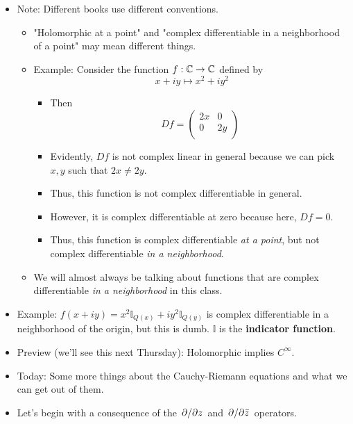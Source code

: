 \documentclass[../notes.tex]{subfiles}
\begin{document}
\begin{itemize}
\begin{itemize}
    \end{itemize}
    \item Note: Different books use different conventions.
    \begin{itemize}
        \item "Holomorphic at a point" and "complex differentiable in a neighborhood of a point" may mean different things.
        \item Example: Consider the function $f:\mathbb{C}\to\mathbb{C}$ defined by
        \begin{equation*}
            x+iy \mapsto x^2+iy^2
        \end{equation*}
        \begin{itemize}
            \item Then
            \begin{equation*}
                Df =
                \begin{pmatrix}
                    2x & 0\\
                    0 & 2y\\
                \end{pmatrix}
            \end{equation*}
            \item Evidently, $Df$ is not complex linear in general because we can pick $x,y$ such that $2x\neq 2y$.
            \item Thus, this function is not complex differentiable in general.
            \item However, it is complex differentiable at zero because here, $Df=0$.
            \item Thus, this function is complex differentiable \emph{at a point}, but not complex differentiable \emph{in a neighborhood}.
        \end{itemize}
        \item We will almost always be talking about functions that are complex differentiable \emph{in a neighborhood} in this class.
    \end{itemize}
    \item Example: $f(x+iy)=x^2\mathbb{I}_{Q(x)}+iy^2\mathbb{I}_{Q(y)}$ is complex differentiable in a neighborhood of the origin, but this is dumb. $\mathbb{I}$ is the \textbf{indicator function}.
    \item Preview (we'll see this next Thursday): Holomorphic implies $C^\infty$.
    \item Today: Some more things about the Cauchy-Riemann equations and what we can get out of them.
    \item Let's begin with a consequence of the $\pdv*{z}$ and $\pdv*{\bar{z}}$ operators.

\end{itemize}
\end{document}
